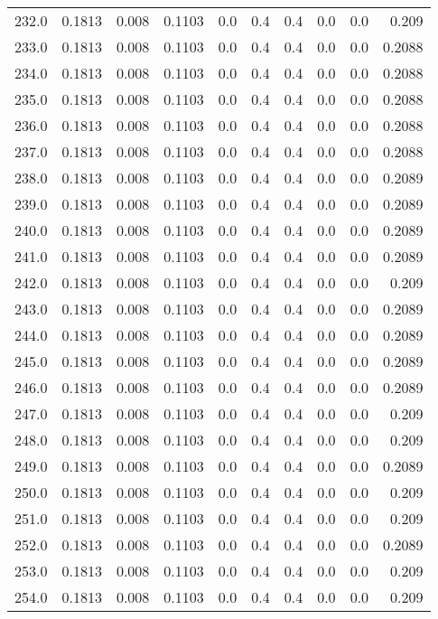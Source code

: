 \begin{longtable}{lrrrrrrrrr}
232.0 & 0.1813 & 0.008 & 0.1103 & 0.0 & 0.4 & 0.4 & 0.0 & 0.0 & 0.209 \\
233.0 & 0.1813 & 0.008 & 0.1103 & 0.0 & 0.4 & 0.4 & 0.0 & 0.0 & 0.2088 \\
234.0 & 0.1813 & 0.008 & 0.1103 & 0.0 & 0.4 & 0.4 & 0.0 & 0.0 & 0.2088 \\
235.0 & 0.1813 & 0.008 & 0.1103 & 0.0 & 0.4 & 0.4 & 0.0 & 0.0 & 0.2088 \\
236.0 & 0.1813 & 0.008 & 0.1103 & 0.0 & 0.4 & 0.4 & 0.0 & 0.0 & 0.2088 \\
237.0 & 0.1813 & 0.008 & 0.1103 & 0.0 & 0.4 & 0.4 & 0.0 & 0.0 & 0.2088 \\
238.0 & 0.1813 & 0.008 & 0.1103 & 0.0 & 0.4 & 0.4 & 0.0 & 0.0 & 0.2089 \\
239.0 & 0.1813 & 0.008 & 0.1103 & 0.0 & 0.4 & 0.4 & 0.0 & 0.0 & 0.2089 \\
240.0 & 0.1813 & 0.008 & 0.1103 & 0.0 & 0.4 & 0.4 & 0.0 & 0.0 & 0.2089 \\
241.0 & 0.1813 & 0.008 & 0.1103 & 0.0 & 0.4 & 0.4 & 0.0 & 0.0 & 0.2089 \\
242.0 & 0.1813 & 0.008 & 0.1103 & 0.0 & 0.4 & 0.4 & 0.0 & 0.0 & 0.209 \\
243.0 & 0.1813 & 0.008 & 0.1103 & 0.0 & 0.4 & 0.4 & 0.0 & 0.0 & 0.2089 \\
244.0 & 0.1813 & 0.008 & 0.1103 & 0.0 & 0.4 & 0.4 & 0.0 & 0.0 & 0.2089 \\
245.0 & 0.1813 & 0.008 & 0.1103 & 0.0 & 0.4 & 0.4 & 0.0 & 0.0 & 0.2089 \\
246.0 & 0.1813 & 0.008 & 0.1103 & 0.0 & 0.4 & 0.4 & 0.0 & 0.0 & 0.2089 \\
247.0 & 0.1813 & 0.008 & 0.1103 & 0.0 & 0.4 & 0.4 & 0.0 & 0.0 & 0.209 \\
248.0 & 0.1813 & 0.008 & 0.1103 & 0.0 & 0.4 & 0.4 & 0.0 & 0.0 & 0.209 \\
249.0 & 0.1813 & 0.008 & 0.1103 & 0.0 & 0.4 & 0.4 & 0.0 & 0.0 & 0.2089 \\
250.0 & 0.1813 & 0.008 & 0.1103 & 0.0 & 0.4 & 0.4 & 0.0 & 0.0 & 0.209 \\
251.0 & 0.1813 & 0.008 & 0.1103 & 0.0 & 0.4 & 0.4 & 0.0 & 0.0 & 0.209 \\
252.0 & 0.1813 & 0.008 & 0.1103 & 0.0 & 0.4 & 0.4 & 0.0 & 0.0 & 0.2089 \\
253.0 & 0.1813 & 0.008 & 0.1103 & 0.0 & 0.4 & 0.4 & 0.0 & 0.0 & 0.209 \\
254.0 & 0.1813 & 0.008 & 0.1103 & 0.0 & 0.4 & 0.4 & 0.0 & 0.0 & 0.209 \\

\end{longtable}
